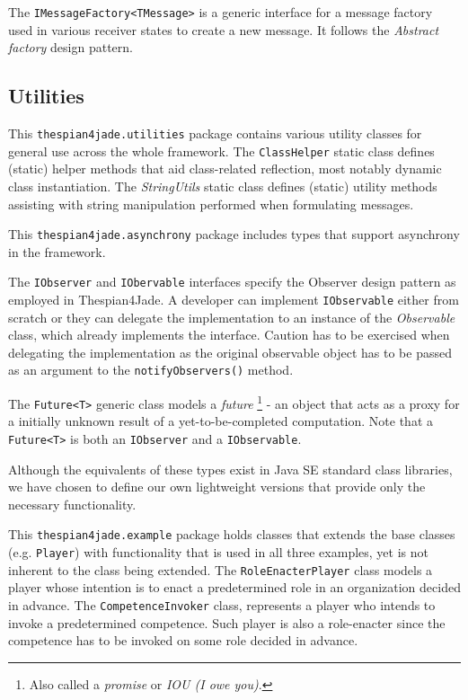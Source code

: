 The \texttt{IMessageFactory<TMessage>} is a generic interface for a message factory used in various receiver states to create a new message.
It follows the \textit{Abstract factory} design pattern.

\subsection{Utilities}

This \texttt{thespian4jade.utilities} package contains various utility classes for general use across the whole framework.
The \texttt{ClassHelper} static class defines (static) helper methods that aid class-related reflection, most notably dynamic class instantiation.
The \textit{StringUtils} static class defines (static) utility methods assisting with string manipulation performed when formulating messages.

This \texttt{thespian4jade.asynchrony} package includes types that support asynchrony in the framework.

The \texttt{IObserver} and \texttt{IObervable} interfaces specify the Observer design pattern as employed in Thespian4Jade.
A developer can implement \texttt{IObservable} either from scratch or they can delegate the implementation to an instance of the \textit{Observable} class, which already implements the interface.
Caution has to be exercised when delegating the implementation as the original observable object has to be passed as an argument to the \texttt{notifyObservers()} method.

The \texttt{Future<T>} generic class models a \textit{future}
\footnote{Also called a \textit{promise} or \textit{IOU (I owe you)}.}
 - an object that acts as a proxy for a initially unknown result of a yet-to-be-completed computation.
Note that a \texttt{Future<T>} is both an \texttt{IObserver} and a \texttt{IObservable}.

Although the equivalents of these types exist in Java SE standard class libraries, we have chosen to define our own lightweight versions that provide only the necessary functionality. 

This \texttt{thespian4jade.example} package holds classes that extends the base classes (e.g. \texttt{Player}) with functionality that is used in all three examples, yet is not inherent to the class being extended.
The \texttt{RoleEnacterPlayer} class models a player whose intention is to enact a predetermined role in an organization decided in advance.
The \texttt{CompetenceInvoker} class, represents a player who intends to invoke a predetermined competence. Such player is also a role-enacter since the competence has to be invoked on some role decided in advance.  